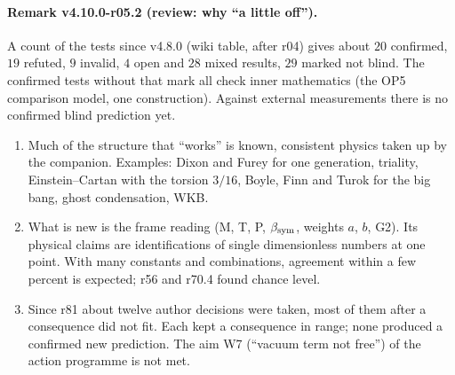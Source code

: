 \paragraph{Remark v4.10.0-r05.2 (review: why ``a little off'').}
A count of the tests since v4.8.0 (wiki table, after r04) gives about \(20\) confirmed, \(19\) refuted, \(9\) invalid, \(4\) open and \(28\) mixed results,
\(29\) marked not blind.  The confirmed tests without that mark all check inner mathematics (the OP5 comparison model, one construction).  Against
external measurements there is no confirmed blind prediction yet.
\begin{enumerate}[leftmargin=2em]
\item[(a)] Much of the structure that ``works'' is known, consistent physics taken up by the companion.  Examples: Dixon and Furey for one generation,
triality, Einstein--Cartan with the torsion \(3/16\), Boyle, Finn and Turok for the big bang, ghost condensation, WKB.
\item[(b)] What is new is the frame reading (M, T, P, \(\beta_{\rm sym}\), weights \(a\), \(b\), G2).  Its physical claims are identifications of single
dimensionless numbers at one point.  With many constants and combinations, agreement within a few percent is expected; r56 and r70.4 found
chance level.
\item[(c)] Since r81 about twelve author decisions were taken, most of them after a consequence did not fit.  Each kept a consequence in range; none
produced a confirmed new prediction.  The aim W7 (``vacuum term not free'') of the action programme is not met.
\end{enumerate}

